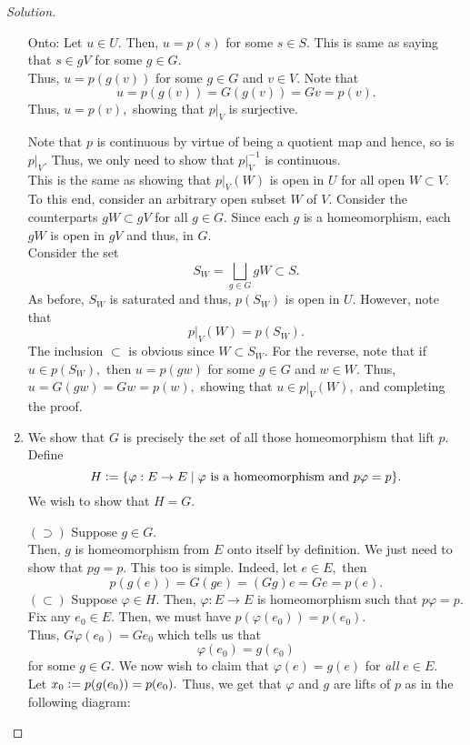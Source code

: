 \documentclass[12pt]{article}
\newenvironment{soln}{\begin{proof}[Solution]}{\end{proof}}
\begin{document}
\begin{soln}
\begin{enumerate}
		Onto: Let $u \in U.$ Then, $u = p(s)$ for some $s \in S.$ This is same as saying that $s \in gV$ for some $g \in G.$\\
		Thus, $u = p(g(v))$ for some $g \in G$ and $v \in V.$ Note that
		\begin{equation*} 
			u = p(g(v)) = G(g(v)) = Gv = p(v).
		\end{equation*}
		Thus, $u = p(v),$ showing that $p|_V$ is surjective.

		Note that $p$ is continuous by virtue of being a quotient map and hence, so is $p|_V.$ Thus, we only need to show that $p|_V^{-1}$ is continuous.\\
		This is the same as showing that $p|_V(W)$ is open in $U$ for all open $W \subset V.$\\
		To this end, consider an arbitrary open subset $W$ of $V.$ Consider the counterparts $gW \subset gV$ for all $g \in G.$ Since each $g$ is a homeomorphism, each $gW$ is open in $gV$ and thus, in $G.$\\
		Consider the set
		\begin{equation*} 
			S_W = \bigsqcup_{g \in G} gW \subset S.
		\end{equation*}
		As before, $S_W$ is saturated and thus, $p(S_W)$ is open in $U.$ However, note that
		\begin{equation*} 
			p|_V(W) = p(S_W).
		\end{equation*}
		The inclusion $\subset$ is obvious since $W \subset S_W.$ For the reverse, note that if $u \in p(S_W),$ then $u = p(gw)$ for some $g \in G$ and $w \in W.$ Thus, $u = G(gw) = Gw = p(w),$ showing that $u \in p|_V(W),$ and completing the proof.
		\item We show that $G$ is precisely the set of all those homeomorphism that lift $p.$ Define
		\begin{equation*} 
			H \vcentcolon= \{\varphi : E \to E \mid \varphi \text{ is a homeomorphism and } p\varphi = p\}.
		\end{equation*}
		We wish to show that $H = G.$

		$(\supset)$ Suppose $g \in G.$\\
		Then, $g$ is homeomorphism from $E$ onto itself by definition. We just need to show that $pg = p.$ This too is simple. Indeed, let $e \in E,$ then
		\begin{equation*} 
			p(g(e)) = G(ge) = (Gg)e = Ge = p(e).
		\end{equation*}
		$(\subset)$ Suppose $\varphi \in H.$ Then, $\varphi:E \to E$ is homeomorphism such that $p\varphi = p.$\\
		Fix any $e_0 \in E.$ Then, we must have $p(\varphi(e_0)) = p(e_0).$\\
		Thus, $G\varphi(e_0) = Ge_0$ which tells us that
		\begin{equation*} 
			\varphi(e_0) = g(e_0)
		\end{equation*}
		for some $g \in G.$ We now wish to claim that $\varphi(e) = g(e)$ for \emph{all} $e \in E.$\\
		Let $x_0 \vcentcolon= p(g(e_0)) = p(e_0).$ Thus, we get that $\varphi$ and $g$ are lifts of $p$ as in the following diagram:
		

\end{enumerate}
\end{soln}
\end{document}
